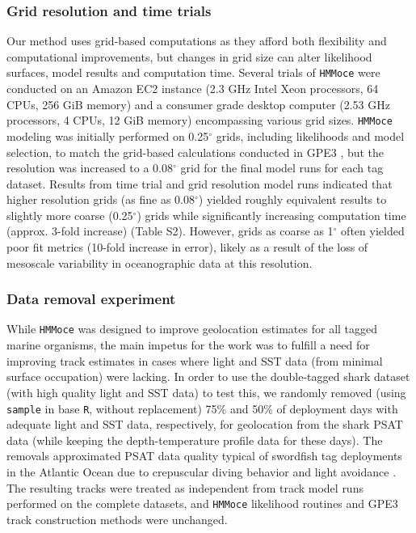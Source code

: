 \subsubsection{Grid resolution and time
trials}%

Our method uses grid-based computations as they afford both flexibility
and computational improvements, but changes in grid size can alter
likelihood surfaces, model results and computation time. Several trials
of \texttt{HMMoce} were conducted on an Amazon EC2 instance (2.3 GHz
Intel Xeon processors, 64 CPUs, 256 GiB memory) and a consumer grade
desktop computer (2.53 GHz processors, 4 CPUs, 12 GiB memory)
encompassing various grid sizes. \texttt{HMMoce} modeling was initially
performed on 0.25$^{\circ}$ grids, including likelihoods and model selection, to
match the grid-based calculations conducted in GPE3 \citep{WC2015}, but
the resolution was increased to a 0.08$^{\circ}$ grid for the final model runs
for each tag dataset. Results from time trial and grid resolution model
runs indicated that higher resolution grids (as fine as 0.08$^{\circ}$) yielded
roughly equivalent results to slightly more coarse (0.25$^{\circ}$) grids while
significantly increasing computation time (approx. 3-fold increase)
(Table S2). However, grids as coarse as 1$^{\circ}$ often yielded poor fit
metrics (10-fold increase in error), likely as a result of the loss of
mesoscale variability in oceanographic data at this resolution.

\subsubsection{Data removal experiment}%

While \texttt{HMMoce} was designed to improve geolocation estimates for
all tagged marine organisms, the main impetus for the work was to
fulfill a need for improving track estimates in cases where light and
SST data (from minimal surface occupation) were lacking. In order to use
the double-tagged shark dataset (with high quality light and SST data)
to test this, we randomly removed (using \texttt{sample} in base
\texttt{R}, without replacement) 75\% and 50\% of deployment days with
adequate light and SST data, respectively, for geolocation from the
shark PSAT data (while keeping the depth-temperature profile data for
these days). The removals approximated PSAT data quality typical of
swordfish tag deployments in the Atlantic Ocean due to crepuscular
diving behavior and light avoidance \citep{Braun2015, Neilson2009}. The
resulting tracks were treated as independent from track model runs
performed on the complete datasets, and \texttt{HMMoce} likelihood
routines and GPE3 track construction methods were unchanged.

